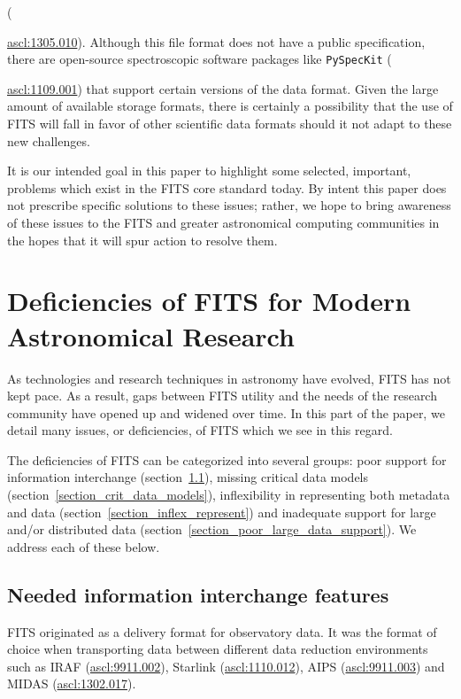 \documentclass[final,authoryear,5p,times,twocolumn]{elsarticle}
\begin{document}
({\href{http://ascl.net/1305.010}{ascl:1305.010}). Although this file
format does not have a public specification,  there are open-source
spectroscopic software packages like \texttt{PySpecKit}
({\href{http://ascl.net/1109.001}{ascl:1109.001}) that support certain
versions of the data format.  Given the large amount of available
storage formats, there is certainly a possibility that the use of FITS
will fall in favor of other scientific data formats should it not adapt
to these new challenges.


It is our intended goal in this paper to highlight some selected,
important, problems which exist in the FITS core standard today.
By intent this paper does not prescribe specific solutions to these issues;
rather, we hope to bring awareness of these issues to the FITS and greater
astronomical computing communities in the hopes that
it will spur action to resolve them.

\section{Deficiencies of FITS for Modern Astronomical Research}
\label{section_deficiencies}

As technologies and research techniques in astronomy have evolved, FITS
has not kept pace. As a result, gaps between FITS utility and the
needs of the research community have opened up and widened over time. In
this part of the paper, we detail many issues, or deficiencies, of FITS
which we see in this regard.


The deficiencies of FITS can be categorized into several groups: poor
support for information interchange
(section~\ref{section_poor_exchange}), missing critical data models
(section~\ref{section_crit_data_models}), inflexibility in representing
both metadata and data (section~\ref{section_inflex_represent}) and
inadequate support for large and/or distributed data
(section~\ref{section_poor_large_data_support}). We address each of
these below.

\subsection{Needed information interchange features}
\label{section_poor_exchange}

FITS originated as a delivery format for observatory data. It was the format
of choice when transporting data between different data reduction
environments such as IRAF (\href{http://ascl.net/9911.002}{ascl:9911.002}),
Starlink (\href{http://ascl.net/1110.012}{ascl:1110.012}), AIPS
(\href{http://ascl.net/9911.003}{ascl:9911.003}) and MIDAS
(\href{http://ascl.net/1302.017}{ascl:1302.017}).


}}
\end{document}
